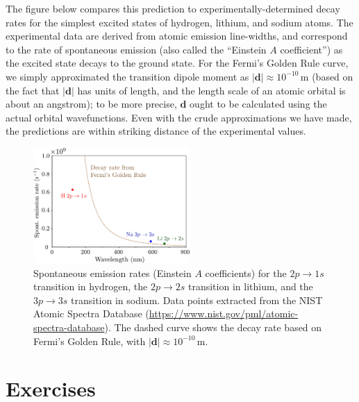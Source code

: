 \documentclass[prx,12pt]{revtex4-2}
\begin{document}
The figure below compares this prediction to experimentally-determined
decay rates for the simplest excited states of hydrogen, lithium, and
sodium atoms.  The experimental data are derived from atomic emission
line-widths, and correspond to the rate of spontaneous emission (also
called the ``Einstein $A$ coefficient'') as the excited state decays
to the ground state.  For the Fermi's Golden Rule curve, we simply
approximated the transition dipole moment as $|\mathbf{d}| \approx
10^{-10}\,\mathrm{m}$ (based on the fact that $|\mathbf{d}|$ has units
of length, and the length scale of an atomic orbital is about an
angstrom); to be more precise, $\mathbf{d}$ ought to be calculated
using the actual orbital wavefunctions.  Even with the crude
approximations we have made, the predictions are within striking
distance of the experimental values.

\begin{figure}[h]
  \centering\includegraphics[width=0.53\textwidth]{emissionrates}
  \caption{Spontaneous emission rates (Einstein $A$ coefficients) for
    the $2p\rightarrow 1s$ transition in hydrogen, the
    $2p\rightarrow2s$ transition in lithium, and the $3p\rightarrow3s$
    transition in sodium.  Data points extracted from the NIST Atomic
    Spectra Database
    (\href{https://www.nist.gov/pml/atomic-spectra-database}{https://www.nist.gov/pml/atomic-spectra-database}).
    The dashed curve shows the decay rate based on Fermi's Golden
    Rule, with $|\mathbf{d}| \approx 10^{-10}\,\mathrm{m}$.  }
\end{figure}


\section*{Exercises}
\end{document}
